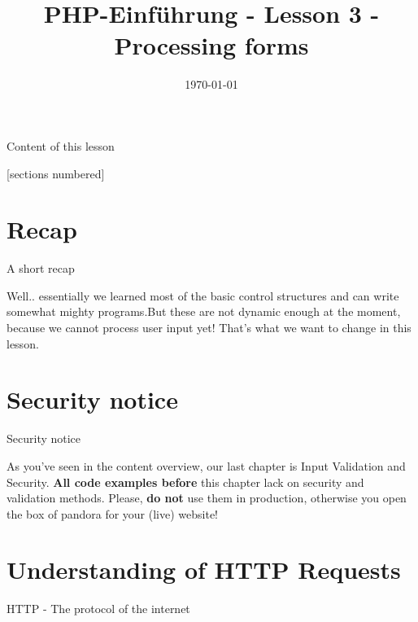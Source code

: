 


\newcommand{\topic}{
	PHP-Einführung - Lesson 3 - Processing forms
}

\title{\topic}
\date{\today}



\maketitle

\begin{frame}{Content of this lesson}

	[sections numbered]
	\tableofcontents

\end{frame}

\section{Recap}

\begin{frame}{A short recap}

	Well.. essentially we learned most of the basic control structures and can write somewhat mighty programs.\pause But these are not dynamic enough at the moment, because we cannot process user input yet! That's what we want to change in this lesson.
\end{frame}

\section{Security notice}

\begin{frame}{Security notice}

	As you've seen in the content overview, our last chapter is Input Validation and Security. \textbf{All code examples before} this chapter lack on security and validation methods. \pause 
	Please, \textbf{do not} use them in production, otherwise you open the box of pandora for your (live) website!
\end{frame}

\section{Understanding of HTTP Requests}

\begin{frame}{HTTP - The protocol of the internet}
\end{frame}

